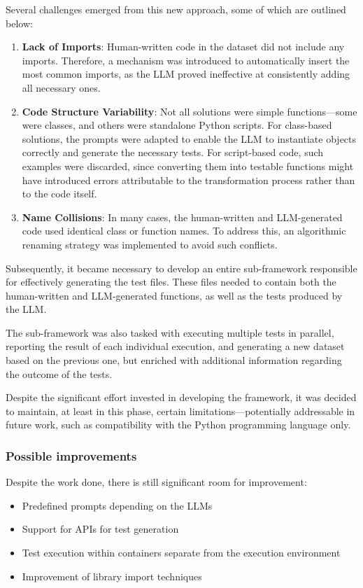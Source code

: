 Several challenges emerged from this new approach, some 
of which are outlined below:

\begin{enumerate}
    \item \textbf{Lack of Imports}: Human-written code in the 
    dataset did not include any imports. Therefore, a mechanism was 
    introduced to automatically insert the most common imports, as the 
    LLM proved ineffective at consistently adding all necessary ones.
    
    \item \textbf{Code Structure Variability}: Not all 
    solutions were simple functions—some were classes, 
    and others were standalone Python scripts. For class-based 
    solutions, the prompts were adapted to enable the LLM to 
    instantiate objects correctly and generate the necessary tests. 
    For script-based code, such examples were discarded, 
    since converting them into testable functions might have 
    introduced errors attributable to the transformation process 
    rather than to the code itself.
    
    \item \textbf{Name Collisions}: In many cases, 
    the human-written and LLM-generated code used identical 
    class or function names. To address this, an algorithmic 
    renaming strategy was implemented to avoid such conflicts.
\end{enumerate}

Subsequently, it became necessary to develop an 
entire sub-framework responsible for effectively 
generating the test files. These files needed to 
contain both the human-written and LLM-generated 
functions, as well as the tests produced by the LLM.

The sub-framework was also tasked with executing 
multiple tests in parallel, reporting the result of 
each individual execution, and generating a new dataset 
based on the previous one, but enriched with additional 
information regarding the outcome of the tests.

Despite the significant effort invested in 
developing the framework, it was decided to maintain, 
at least in this phase, certain limitations—potentially 
addressable in future work, such as compatibility with the 
Python programming language only.

\subsubsection{Possible improvements}
Despite the work done, there is still significant room for improvement:
\begin{itemize}
\item Predefined prompts depending on the LLMs
\item Support for APIs for test generation
\item Test execution within containers separate from the execution environment
\item Improvement of library import techniques
\end{itemize}